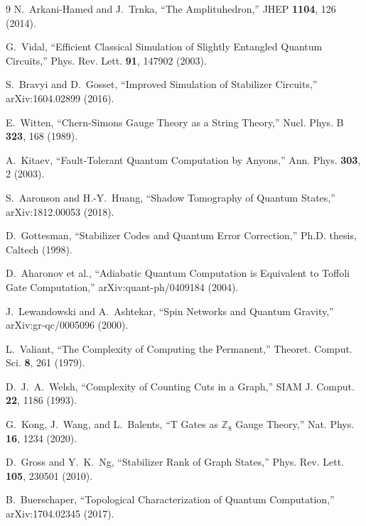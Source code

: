 \documentclass[12pt]{article}
\theoremstyle{plain}
\theoremstyle{definition}
\begin{document}
\begin{thebibliography}{9}
N.~Arkani-Hamed and J.~Trnka, ``The Amplituhedron,'' JHEP \textbf{1104}, 126 (2014).

G.~Vidal, ``Efficient Classical Simulation of Slightly Entangled Quantum Circuits,'' Phys. Rev. Lett. \textbf{91}, 147902 (2003).

S.~Bravyi and D.~Gosset, ``Improved Simulation of Stabilizer Circuits,'' arXiv:1604.02899 (2016).

E.~Witten, ``Chern-Simons Gauge Theory as a String Theory,'' Nucl. Phys. B \textbf{323}, 168 (1989).

A.~Kitaev, ``Fault-Tolerant Quantum Computation by Anyons,'' Ann. Phys. \textbf{303}, 2 (2003).

S.~Aaronson and H.-Y.~Huang, ``Shadow Tomography of Quantum States,'' arXiv:1812.00053 (2018).

D.~Gottesman, ``Stabilizer Codes and Quantum Error Correction,'' Ph.D. thesis, Caltech (1998).

D.~Aharonov et al., ``Adiabatic Quantum Computation is Equivalent to Toffoli Gate Computation,'' arXiv:quant-ph/0409184 (2004).

J.~Lewandowski and A.~Ashtekar, ``Spin Networks and Quantum Gravity,'' arXiv:gr-qc/0005096 (2000).

L.~Valiant, ``The Complexity of Computing the Permanent,'' Theoret. Comput. Sci. \textbf{8}, 261 (1979).

D.~J.~A.~Welsh, ``Complexity of Counting Cuts in a Graph,'' SIAM J. Comput. \textbf{22}, 1186 (1993).

G.~Kong, J.~Wang, and L.~Balents, ``T Gates as $\mathbb{Z}_8$ Gauge Theory,'' Nat. Phys. \textbf{16}, 1234 (2020).

D.~Gross and Y.~K.~Ng, ``Stabilizer Rank of Graph States,'' Phys. Rev. Lett. \textbf{105}, 230501 (2010).

B.~Buerschaper, ``Topological Characterization of Quantum Computation,'' arXiv:1704.02345 (2017).
\end{thebibliography}
\end{document}
